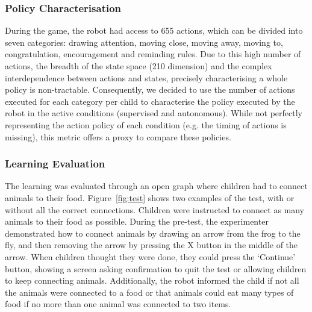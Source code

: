 \subsubsection{Policy Characterisation}

During the game, the robot had access to 655 actions, which can be divided into seven categories: drawing attention, moving close, moving away, moving to, congratulation, encouragement and reminding rules. Due to this high number of actions, the breadth of the state space (210 dimension) and the complex interdependence between actions and states, precisely characterising a whole policy is non-tractable. Consequently, we decided to use the number of actions executed for each category per child to characterise the policy executed by the robot in the active conditions (supervised and autonomous). While not perfectly representing the action policy of each condition (e.g. the timing of actions is missing), this metric offers a proxy to compare these policies. 

\subsubsection{Learning Evaluation} \label{sec:tuto_test}
The learning was evaluated through an open graph where children had to connect animals to their food. Figure~\ref{fig:test} shows two examples of the test, with or without all the correct connections. Children were instructed to connect as many animals to their food as possible. During the pre-test, the experimenter demonstrated how to connect animals by drawing an arrow from the frog to the fly, and then removing the arrow by pressing the X button in the middle of the arrow. When children thought they were done, they could press the `Continue' button, showing a screen asking confirmation to quit the test or allowing children to keep connecting animals. Additionally, the robot informed the child if not all the animals were connected to a food or that animals could eat many types of food if no more than one animal was connected to two items. 

